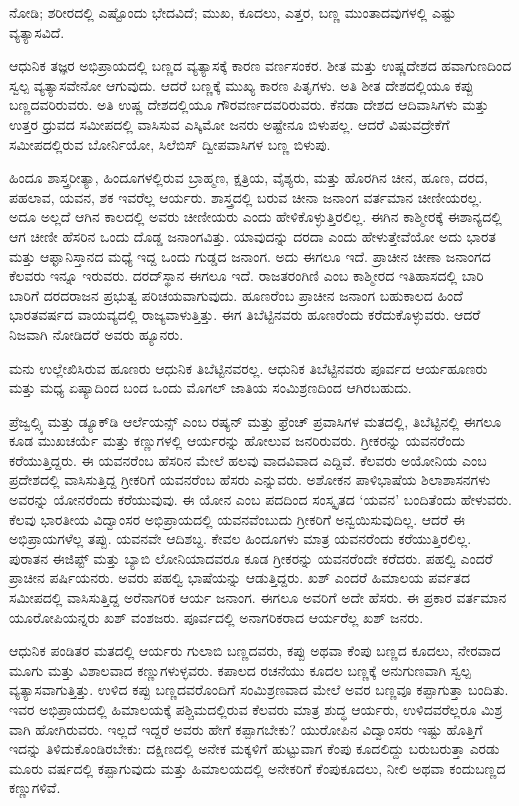 ನೋಡಿ; ಶರೀರದಲ್ಲಿ ಎಷ್ಟೊಂದು ಭೇದವಿದೆ; ಮುಖ, ಕೂದಲು, ಎತ್ತರ, ಬಣ್ಣ ಮುಂತಾದವುಗಳಲ್ಲಿ ಎಷ್ಟು ವ್ಯತ್ಯಾಸವಿದೆ.

ಆಧುನಿಕ ತಜ್ಞರ ಅಭಿಪ್ರಾಯದಲ್ಲಿ ಬಣ್ಣದ ವ್ಯತ್ಯಾಸಕ್ಕೆ ಕಾರಣ ವರ್ಣಸಂಕರ. ಶೀತ ಮತ್ತು ಉಷ್ಣದೇಶದ ಹವಾಗುಣದಿಂದ ಸ್ವಲ್ಪ ವ್ಯತ್ಯಾಸವೇನೋ ಆಗುವುದು. ಆದರೆ ಬಣ್ಣಕ್ಕೆ ಮುಖ್ಯ ಕಾರಣ ಪಿತೃಗಳು. ಅತಿ ಶೀತ ದೇಶದಲ್ಲಿಯೂ ಕಪ್ಪು ಬಣ್ಣದವರಿರುವರು. ಅತಿ ಉಷ್ಣ ದೇಶದಲ್ಲಿಯೂ ಗೌರವರ್ಣದವರಿರುವರು. ಕೆನಡಾ ದೇಶದ ಆದಿವಾಸಿಗಳು ಮತ್ತು ಉತ್ತರ ಧ್ರುವದ ಸಮೀಪದಲ್ಲಿ ವಾಸಿಸುವ ಎಸ್ಕಿಮೋ ಜನರು ಅಷ್ಟೇನೂ ಬಿಳುಪಲ್ಲ. ಆದರೆ ವಿಷುವದ್ರೇಕೆಗೆ ಸಮೀಪದಲ್ಲಿರುವ ಬೋರ್ನಿಯೋ, ಸಿಲೆಬಿಸ್​ ದ್ವೀಪವಾಸಿಗಳ ಬಣ್ಣ ಬಿಳುಪು.

ಹಿಂದೂ ಶಾಸ್ತ್ರರೀತ್ಯಾ, ಹಿಂದೂಗಳಲ್ಲಿರುವ ಬ್ರಾಹ್ಮಣ, ಕ್ಷತ್ರಿಯ, ವೈಶ್ಯರು, ಮತ್ತು ಹೊರಗಿನ ಚೀನ, ಹೂಣ, ದರದ, ಪಹಲಾವ, ಯವನ, ಶಕ ಇವರೆಲ್ಲ ಆರ್ಯರು. ಶಾಸ್ತ್ರದಲ್ಲಿ ಬರುವ ಚೀನಾ ಜನಾಂಗ ವರ್ತಮಾನ ಚೀಣೀಯರಲ್ಲ. ಅದೂ ಅಲ್ಲದೆ ಆಗಿನ ಕಾಲದಲ್ಲಿ ಅವರು ಚೀಣೀಯರು ಎಂದು ಹೇಳಿಕೊಳ್ಳುತ್ತಿರಲಿಲ್ಲ. ಈಗಿನ ಕಾಶ್ಮೀರಕ್ಕೆ ಈಶಾನ್ಯದಲ್ಲಿ ಆಗ ಚೀಣೀ ಹೆಸರಿನ ಒಂದು ದೊಡ್ಡ ಜನಾಂಗವಿತ್ತು. ಯಾವುದನ್ನು ದರದಾ ಎಂದು ಹೇಳುತ್ತೇವೆಯೋ ಅದು ಭಾರತ ಮತ್ತು ಆಫ್ಘಾನಿಸ್ತಾನದ ಮಧ್ಯೆ ಇದ್ದ ಒಂದು ಗುಡ್ಡದ ಜನಾಂಗ. ಅದು ಈಗಲೂ ಇದೆ. ಪ್ರಾಚೀನ ಚೀಣಾ ಜನಾಂಗದ ಕೆಲವರು ಇನ್ನೂ ಇರುವರು. ದರದ್​ಸ್ಥಾನ ಈಗಲೂ ಇದೆ. ರಾಜತರಂಗಿಣಿ ಎಂಬ ಕಾಶ್ಮೀರದ ಇತಿಹಾಸದಲ್ಲಿ ಬಾರಿ ಬಾರಿಗೆ ದರದರಾಜನ ಪ್ರಭುತ್ವ ಪರಿಚಯವಾಗುವುದು. ಹೂಣರೆಂಬ ಪ್ರಾಚೀನ ಜನಾಂಗ ಬಹುಕಾಲದ ಹಿಂದೆ ಭಾರತವರ್ಷದ ವಾಯವ್ಯದಲ್ಲಿ ರಾಜ್ಯವಾಳುತ್ತಿತ್ತು. ಈಗ ತಿಬೆಟ್ಟಿನವರು ಹೂಣರೆಂದು ಕರೆದುಕೊಳ್ಳುವರು. ಆದರೆ ನಿಜವಾಗಿ ನೋಡಿದರೆ ಅವರು ಹ್ಯೂನರು.

\newpage

ಮನು ಉಲ್ಲೇಖಿಸಿರುವ ಹೂಣರು ಆಧುನಿಕ ತಿಬೆಟ್ಟಿನವರಲ್ಲ. ಆಧುನಿಕ ತಿಬೆಟ್ಟಿನವರು ಪೂರ್ವದ ಆರ್ಯಹೂಣರು ಮತ್ತು ಮಧ್ಯ ಏಷ್ಯಾದಿಂದ ಬಂದ ಒಂದು ಮೊಗಲ್​ ಜಾತಿಯ ಸಂಮಿಶ್ರಣದಿಂದ ಆಗಿರಬಹುದು.

ಪ್ರೆಜ್ವಲ್ಸ್ಕಿ ಮತ್ತು ಡ್ಯೂಕ್​ಡಿ ಆರ್ಲೆಯನ್ಸ್​ ಎಂಬ ರಷ್ಯನ್​ ಮತ್ತು ಫ್ರೆಂಚ್​ ಪ್ರವಾಸಿಗಳ ಮತದಲ್ಲಿ, ತಿಬೆಟ್ಟಿನಲ್ಲಿ ಈಗಲೂ ಕೂಡ ಮುಖಚರ್ಯೆ ಮತ್ತು ಕಣ್ಣುಗಳಲ್ಲಿ ಆರ್ಯರನ್ನು ಹೋಲುವ ಜನರಿರುವರು. ಗ್ರೀಕರನ್ನು ಯವನರೆಂದು ಕರೆಯುತ್ತಿದ್ದರು. ಈ ಯವನರೆಂಬ ಹೆಸರಿನ ಮೇಲೆ ಹಲವು ವಾದವಿವಾದ ಎದ್ದಿವೆ. ಕೆಲವರು ಅಯೋನಿಯ ಎಂಬ ಪ್ರದೇಶದಲ್ಲಿ ವಾಸಿಸುತ್ತಿದ್ದ ಗ್ರೀಕರಿಗೆ ಯವನರೆಂಬ ಹೆಸರು ಎನ್ನುವರು. ಅಶೋಕನ ಪಾಳಿಭಾಷೆಯ ಶಿಲಾಶಾಸನಗಳು ಅವರನ್ನು ಯೋನರೆಂದು ಕರೆಯುವುವು. ಈ ಯೋನ ಎಂಬ ಪದದಿಂದ ಸಂಸ್ಕೃತದ ‘ಯವನ’ ಬಂದಿತೆಂದು ಹೇಳುವರು. ಕೆಲವು ಭಾರತೀಯ ವಿದ್ವಾಂಸರ ಅಭಿಪ್ರಾಯದಲ್ಲಿ ಯವನವೆಂಬುದು ಗ್ರೀಕರಿಗೆ ಅನ್ವಯಿಸುವುದಿಲ್ಲ. ಆದರೆ ಈ ಅಭಿಪ್ರಾಯಗಳೆಲ್ಲ ತಪ್ಪು. ಯವನವೇ ಆದಿಶಬ್ದ. ಕೇವಲ ಹಿಂದೂಗಳು ಮಾತ್ರ ಯವನರೆಂದು ಕರೆಯುತ್ತಿರಲಿಲ್ಲ. ಪುರಾತನ ಈಜಿಪ್ಟ್​ ಮತ್ತು ಬ್ಯಾಬಿ ಲೋನಿಯಾದವರೂ ಕೂಡ ಗ್ರೀಕರನ್ನು ಯವನರೆಂದೇ ಕರೆದರು. ಪಹಲ್ವಿ ಎಂದರೆ ಪ್ರಾಚೀನ ಪರ್ಷಿಯನರು. ಅವರು ಪಹಲ್ವಿ ಭಾಷೆಯನ್ನು ಆಡುತ್ತಿದ್ದರು. ಖಶ್​ ಎಂದರೆ ಹಿಮಾಲಯ ಪರ್ವತದ ಸಮೀಪದಲ್ಲಿ ವಾಸಿಸುತ್ತಿದ್ದ ಅರೆನಾಗರಿಕ ಆರ್ಯ ಜನಾಂಗ. ಈಗಲೂ ಅವರಿಗೆ ಅದೇ ಹೆಸರು. ಈ ಪ್ರಕಾರ ವರ್ತಮಾನ ಯೂರೋಪಿಯನ್ನರು ಖಶ್​ ವಂಶಜರು. ಪೂರ್ವದಲ್ಲಿ ಅನಾಗರಿಕರಾದ ಆರ್ಯರೆಲ್ಲ ಖಶ್​ ಜನರು.

ಆಧುನಿಕ ಪಂಡಿತರ ಮತದಲ್ಲಿ ಆರ್ಯರು ಗುಲಾಬಿ ಬಣ್ಣದವರು, ಕಪ್ಪು ಅಥವಾ ಕೆಂಪು ಬಣ್ಣದ ಕೂದಲು, ನೇರವಾದ ಮೂಗು ಮತ್ತು ವಿಶಾಲವಾದ ಕಣ್ಣುಗಳುಳ್ಳವರು. ಕಪಾಲದ ರಚನೆಯು ಕೂದಲ ಬಣ್ಣಕ್ಕೆ ಅನುಗುಣವಾಗಿ ಸ್ವಲ್ಪ ವ್ಯತ್ಯಾಸವಾಗುತ್ತಿತ್ತು. ಉಳಿದ ಕಪ್ಪು ಬಣ್ಣದವರೊಂದಿಗೆ ಸಂಮಿಶ್ರಣವಾದ ಮೇಲೆ ಅವರ ಬಣ್ಣವೂ ಕಪ್ಪಾಗುತ್ತಾ ಬಂದಿತು. ಇವರ ಅಭಿಪ್ರಾಯದಲ್ಲಿ ಹಿಮಾಲಯಕ್ಕೆ ಪಶ್ಚಿಮದಲ್ಲಿರುವ ಕೆಲವರು ಮಾತ್ರ ಶುದ್ಧ ಆರ್ಯರು, ಉಳಿದವರೆಲ್ಲರೂ ಮಿಶ್ರ ವಾಗಿ ಹೋಗಿರುವರು. ಇಲ್ಲದೆ ಇದ್ದರೆ ಅವರು ಹೇಗೆ ಕಪ್ಪಾಗಬೇಕು? ಯುರೋಪಿನ ವಿದ್ವಾಂಸರು ಇಷ್ಟು ಹೊತ್ತಿಗೆ ಇದನ್ನು ತಿಳಿದುಕೊಂಡಿರಬೇಕು: ದಕ್ಷಿಣದಲ್ಲಿ ಅನೇಕ ಮಕ್ಕಳಿಗೆ ಹುಟ್ಟುವಾಗ ಕೆಂಪು ಕೂದಲಿದ್ದು ಬರುಬರುತ್ತಾ ಎರಡು ಮೂರು ವರ್ಷದಲ್ಲಿ ಕಪ್ಪಾಗುವುದು ಮತ್ತು ಹಿಮಾಲಯದಲ್ಲಿ ಅನೇಕರಿಗೆ ಕೆಂಪುಕೂದಲು, ನೀಲಿ ಅಥವಾ ಕಂದುಬಣ್ಣದ ಕಣ್ಣುಗಳಿವೆ.

